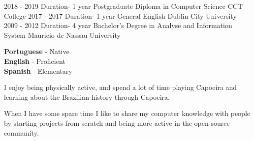 \documentclass[9pt]{developercv} %
\begin{document}


\begin{entrylist}	
	\entry
		{2018 - 2019}
		{Duration- 1 year}
		{Postgraduate Diploma in Computer Science}
		{CCT College}
	\entry
		{2017 - 2017}
		{Duration- 1 year}
		{General English}
		{Dublin City University}
	\entry
		{2009 - 2012}
		{Duration- 4 year}
		{Bachelor's Degree in  Analyse and Information System}
		{Mauricio de Nassau University}
\end{entrylist}
\newpage
\begin{minipage}[t]{0.3\textwidth}

	\vspace{-\baselineskip} %

	
	\textbf{Portuguese} - Native\\
	\textbf{English} - Proficient\\
	\textbf{Spanish} - Elementary
\end{minipage}
\hfill
\begin{minipage}[t]{0.3\textwidth}

	\vspace{-\baselineskip} %
	
	
	I enjoy being physically active, and spend a lot of time playing Capoeira and learning about the Brazilian history through Capoeira.
\end{minipage}
\hfill
\begin{minipage}[t]{0.3\textwidth}
	\vspace{-\baselineskip} %
	

When I have some spare time I like to share my computer knowledge with people by starting projects from scratch and being more active in the open-source community.
\end{minipage}
\end{document}
